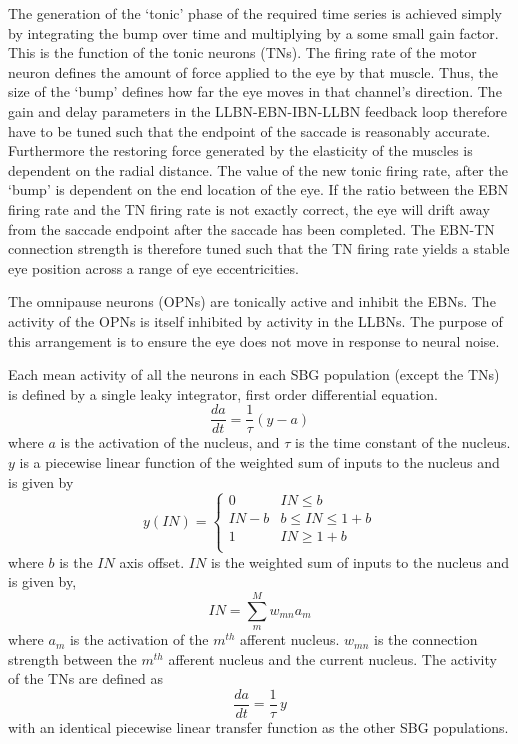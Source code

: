 \documentclass{frontiersSCNS}
\begin{document}
The generation of the `tonic' phase of the required time series is
achieved simply by integrating the bump over time and multiplying by a
some small gain factor.  This is the function of the tonic neurons (TNs).
The firing rate of the motor neuron defines the amount of force applied
to the eye by that muscle.  Thus, the size of the `bump' defines how far
the eye moves in that channel's direction.  The gain and delay parameters
in the LLBN-EBN-IBN-LLBN feedback loop therefore have to be tuned such that
the endpoint of the saccade is reasonably accurate.  Furthermore the
restoring force generated by the elasticity of the muscles is dependent
on the radial distance.  The value of the new tonic firing rate, after
the `bump' is dependent on the end location of the eye.  If the ratio
between the EBN firing rate and the TN firing rate is not exactly
correct, the eye will drift away from the saccade endpoint after the
saccade has been completed.  The EBN-TN connection strength is
therefore tuned such that the TN firing rate yields a stable eye
position across a range of eye eccentricities.

The omnipause neurons (OPNs) are tonically active and inhibit the EBNs.
The activity of the OPNs is itself inhibited by activity in the LLBNs.
The purpose of this arrangement is to ensure the eye does not move in
response to neural noise.

Each mean activity of all the neurons in each SBG population (except the
TNs) is defined by a single leaky integrator, first order differential equation.
\begin{equation}\label{eq:thetas_to_r}
   \frac{da}{dt} = \frac{1}{\tau}(y-a)
\end{equation}
where $a$ is the activation of the nucleus, and $\tau$ is the time constant
of the nucleus. $y$ is a piecewise linear function of the weighted sum of
inputs to the nucleus and is given by
\begin{equation}
       y(IN) = \begin{cases}
       0    & IN \leq b \\
      IN-b   & b \leq IN \leq 1+b \\
      1   & IN \geq 1+b \\
   \end{cases}
\end{equation}
where $b$ is the $IN$ axis offset.  $IN$ is the weighted sum of inputs to
the nucleus and is given by,
\begin{equation}
    IN = \sum_{m}^{M} w_{mn} a_{m}
\end{equation}
where $a_{m}$ is the activation of the $m^{th}$ afferent nucleus.
$w_{mn}$ is the connection strength between the $m^{th}$ afferent nucleus
and the current nucleus. The activity of the TNs are defined as
\begin{equation}
   \frac{da}{dt} = \frac{1}{\tau}\,y
\end{equation}
with an identical piecewise linear transfer function as the other SBG populations.
\end{document}
